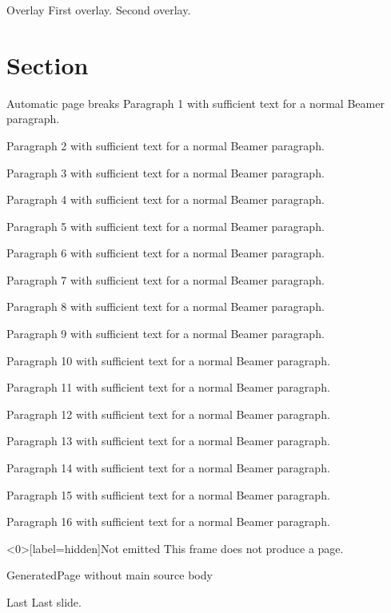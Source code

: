 \documentclass[aspectratio=169]{beamer}
\newcommand\sourcelessframe{\begin{frame}[label=generated]{Generated}Page without main source body\end{frame}}
\begin{document}
\begin{frame}[label=overlay]{Overlay}
First overlay.
\pause
Second overlay.
\end{frame}
\section{Section}
\begin{frame}[allowframebreaks]{Automatic page breaks}
Paragraph 1 with sufficient text for a normal Beamer paragraph.\par{}
Paragraph 2 with sufficient text for a normal Beamer paragraph.\par{}
Paragraph 3 with sufficient text for a normal Beamer paragraph.\par{}
Paragraph 4 with sufficient text for a normal Beamer paragraph.\par{}
Paragraph 5 with sufficient text for a normal Beamer paragraph.\par{}
Paragraph 6 with sufficient text for a normal Beamer paragraph.\par{}
Paragraph 7 with sufficient text for a normal Beamer paragraph.\par{}
Paragraph 8 with sufficient text for a normal Beamer paragraph.\par{}
Paragraph 9 with sufficient text for a normal Beamer paragraph.\par{}
Paragraph 10 with sufficient text for a normal Beamer paragraph.\par{}
Paragraph 11 with sufficient text for a normal Beamer paragraph.\par{}
Paragraph 12 with sufficient text for a normal Beamer paragraph.\par{}
Paragraph 13 with sufficient text for a normal Beamer paragraph.\par{}
Paragraph 14 with sufficient text for a normal Beamer paragraph.\par{}
Paragraph 15 with sufficient text for a normal Beamer paragraph.\par{}
Paragraph 16 with sufficient text for a normal Beamer paragraph.\par{}
\end{frame}
\begin{frame}<0>[label=hidden]{Not emitted}
This frame does not produce a page.
\end{frame}
\sourcelessframe
\begin{frame}[label=last]{Last}
Last slide.
\end{frame}
\end{document}
